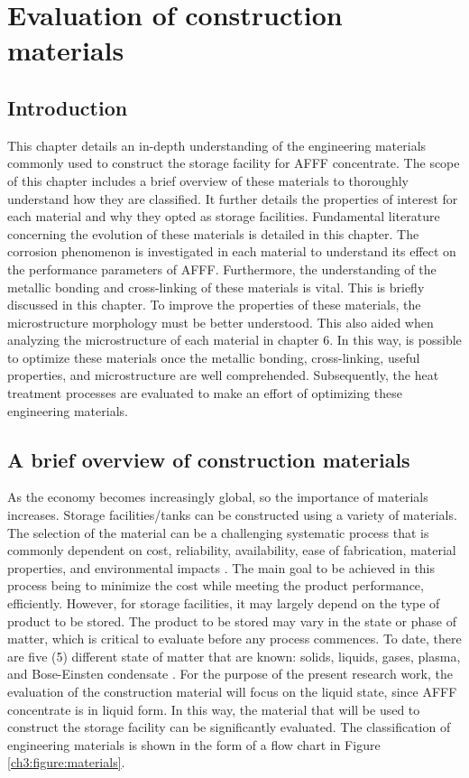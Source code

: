 \chapter{Evaluation of construction materials}
\section{Introduction}
This chapter details an in-depth understanding of the engineering materials commonly used to construct the storage facility for AFFF concentrate. The scope of this chapter includes a brief overview of these materials to thoroughly understand how they are classified. It further details the properties of interest for each material and why they opted as storage facilities.
Fundamental literature concerning the evolution of these materials is detailed in this chapter. The corrosion phenomenon is investigated in each material to understand its effect on the performance parameters of AFFF. Furthermore, the understanding of the metallic bonding and cross-linking of these materials is vital. This is briefly discussed in this chapter. To improve the properties of these materials, the microstructure morphology must be better understood. This also aided when analyzing the microstructure of each material in chapter 6. In this way, is possible to optimize these materials once the metallic bonding, cross-linking, useful properties, and microstructure are well comprehended. Subsequently, the heat treatment processes are evaluated to make an effort of optimizing these engineering materials.

\section{A brief overview of construction materials}
As the economy becomes increasingly global, so the importance of materials increases. Storage facilities/tanks can be constructed using a variety of materials. The selection of the material can be a challenging systematic process that is commonly dependent on cost, reliability, availability, ease of fabrication, material properties, and environmental impacts \cite{hench2005biomaterials}.  The main goal to be achieved in this process being to minimize the cost while meeting the product performance, efficiently. However, for storage facilities, it may largely depend on the type of product to be stored. The product to be stored may vary in the state or phase of matter, which is critical to evaluate before any process commences. To date, there are five (5) different state of matter that are known: solids, liquids, gases, plasma, and Bose-Einsten condensate \cite{ceruti2002states}. 
For the purpose of the present research work, the evaluation of the construction material will focus on the liquid state, since AFFF concentrate is in liquid form. In this way, the material that will be used to construct the storage facility can be significantly evaluated. The classification of engineering materials is shown in the form of a flow chart in Figure \ref{ch3:figure:materials}.

